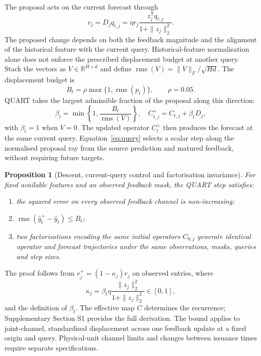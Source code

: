 \documentclass[preprint,12pt,times,nonatbib]{elsarticle}
\newtheorem{proposition}{Proposition}
\newcommand{\R}{\mathbb R}
\newcommand{\rms}{\operatorname{rms}}
\begin{document}
The proposal acts on the current forecast through
\begin{equation}\label{eq:transfer}
 v_j=D_jq_{t,j}
 =\eta r_j\frac{z_j^{\mathsf T}q_{t,j}}{1+\|z_j\|_2^2}.
\end{equation}
The proposed change depends on both the feedback magnitude and the alignment of the historical feature with the current query. Historical-feature normalisation alone does not enforce the prescribed displacement budget at another query. Stack the vectors as $V\in\R^{H\times d}$ and define $\rms(V)=\|V\|_F/\sqrt{Hd}$. The displacement budget is
\begin{equation}
 B_t=\rho\max\{1,\rms(p_t)\},\qquad \rho=0.05.
\end{equation}
QUART takes the largest admissible fraction of the proposal along this direction:
\begin{equation}\label{eq:query}
 \beta_t=\min\left\{1,\frac{B_t}{\rms(V)}\right\},\quad
 C_{t,j}^{+}=C_{t,j}+\beta_tD_j,
\end{equation}
with $\beta_t=1$ when $V=0$. The updated operator $C_t^{+}$ then produces the forecast at the same current query. Equation~\eqref{eq:query} selects a scalar step along the normalised proposal ray from the source prediction and matured feedback, without requiring future targets.

\begin{proposition}[Descent, current-query control and factorisation invariance]\label{prop:control}
For fixed available features and an observed feedback mask, the QUART step satisfies:
\begin{enumerate}
\item the squared error on every observed feedback channel is non-increasing;
\item $\rms(\widehat y_t^{+}-\widehat y_t)\leq B_t$;
\item two factorisations encoding the same initial operators $C_{0,j}$ generate identical operator and forecast trajectories under the same observations, masks, queries and step sizes.
\end{enumerate}
\end{proposition}

The proof follows from $r_j^{+}=(1-\kappa_j)r_j$ on observed entries, where
\begin{equation}
 \kappa_j=\beta_t\eta\frac{\|z_j\|_2^2}{1+\|z_j\|_2^2}\in[0,1],
\end{equation}
and the definition of $\beta_t$. The effective map $C$ determines the recurrence; Supplementary Section S1 provides the full derivation. The bound applies to joint-channel, standardised displacement across one feedback update at a fixed origin and query. Physical-unit channel limits and changes between issuance times require separate specifications.
\end{document}

